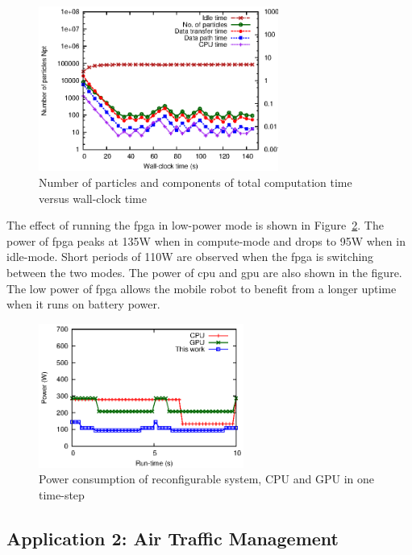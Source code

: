 \begin{figure}[t!]
\centering
\includegraphics[width=0.7\textwidth]{4_adaptation/figures/fig_adaptive}
\caption{Number of particles and components of total computation time versus wall-clock time}
\label{fig:adaptiveb}
\end{figure}

The effect of running the \gls{fpga} in low-power mode is shown in Figure~\ref{fig:powerb}.
The power of \gls{fpga} peaks at 135W when in compute-mode and drops to 95W when in idle-mode.
Short periods of 110W are observed when the \gls{fpga} is switching between the two modes.
The power of \gls{cpu} and \gls{gpu} are also shown in the figure.
The low power of \gls{fpga} allows the mobile robot to benefit from a longer uptime when it runs on battery power.

\begin{figure}[t!]
\centering
\includegraphics[width=0.6\textwidth]{5_tool/figures/fig_power}
\caption[Power consumption of reconfigurable system, CPU and GPU in one time-step]{Power consumption of reconfigurable system, CPU and GPU in one time-step}
\label{fig:powerb}
\end{figure}

\subsection{Application 2: Air Traffic Management}

